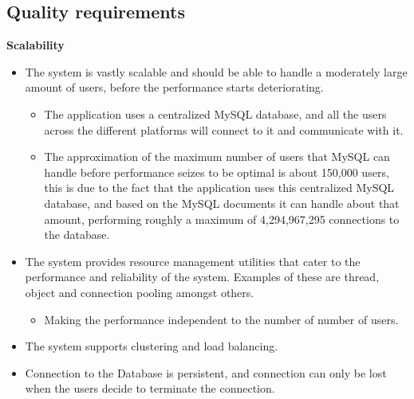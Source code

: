 \documentclass[10pt,a4paper]{article}
\begin{document}
\subsection{Quality requirements}
\indent\indent\textbf{Scalability}
                               \begin{itemize}
                                                \item The system is vastly scalable and should be able to handle a moderately large amount of users, before the performance starts deteriorating.
                                                \begin{itemize}
                                                                \item The application uses a centralized MySQL database, and all the users across the different platforms will connect to it and communicate with it. 
                                                                \item The approximation of the maximum number of users that MySQL can handle before performance seizes to be optimal is about 150,000 users, this is due to the fact that the application uses this centralized MySQL database, and based on the MySQL documents it can handle about that amount, performing roughly a maximum of 4,294,967,295 connections to the database. 
                                                \end{itemize}
                                \end{itemize}
                \begin{itemize}
                        \item The system provides resource management utilities that cater to the performance and reliability of the system. Examples of these are thread, object and connection pooling amongst others.
                        \begin{itemize}
                                \item Making the performance independent to the number of number of users.
                        \end{itemize}
                \end{itemize}
                \begin{itemize}
                        \item The system supports clustering and load balancing.
                \end{itemize}
                \begin{itemize}
                        \item Connection to the Database is persistent, and connection can only be lost when the users decide to terminate the connection.\\
                \end{itemize}
\end{document}
